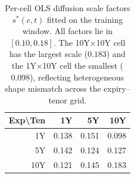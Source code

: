 \begin{table}[H]
\centering
\caption{Per-cell OLS diffusion scale factors $s^*(e,t)$ fitted on the training window. All factors lie in $[0.10, 0.18]$. The 10Y$\times$10Y cell has the largest scale ($0.183$) and the 1Y$\times$10Y cell the smallest ($0.098$), reflecting heterogeneous shape mismatch across the expiry--tenor grid.}
\label{tab:per_cell_scales}
\begin{tabular}{@{}rrrr@{}}
\toprule
\textbf{Exp\textbackslash Ten} & \textbf{1Y} & \textbf{5Y} & \textbf{10Y} \\
\midrule
1Y & 0.138 & 0.151 & 0.098 \\
\addlinespace[2pt]
5Y & 0.142 & 0.124 & 0.127 \\
\addlinespace[2pt]
10Y & 0.121 & 0.145 & 0.183 \\
\bottomrule
\end{tabular}
\end{table}